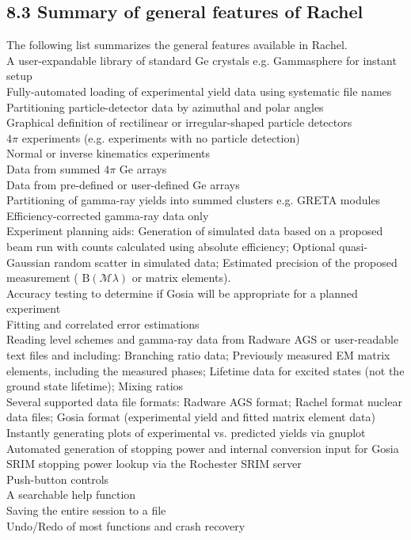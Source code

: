 \documentclass[10pt]{article}
\begin{document}
\subsection*{8.3 Summary of general features of Rachel}
The following list summarizes the general features available in Rachel.\\
A user-expandable library of standard Ge crystals e.g. Gammasphere for instant setup\\
Fully-automated loading of experimental yield data using systematic file names\\
Partitioning particle-detector data by azimuthal and polar angles\\
Graphical definition of rectilinear or irregular-shaped particle detectors\\
$4 \pi$ experiments (e.g. experiments with no particle detection)\\
Normal or inverse kinematics experiments\\
Data from summed $4 \pi$ Ge arrays\\
Data from pre-defined or user-defined Ge arrays\\
Partitioning of gamma-ray yields into summed clusters e.g. GRETA modules\\
Efficiency-corrected gamma-ray data only\\
Experiment planning aids: Generation of simulated data based on a proposed beam run with counts calculated using absolute efficiency; Optional quasi-Gaussian random scatter in simulated data; Estimated precision of the proposed measurement ( $\mathrm{B}(\mathcal{M} \lambda)$ or matrix elements).\\
Accuracy testing to determine if Gosia will be appropriate for a planned experiment\\
Fitting and correlated error estimations\\
Reading level schemes and gamma-ray data from Radware AGS or user-readable text files and including: Branching ratio data; Previously measured EM matrix elements, including the measured phases; Lifetime data for excited states (not the ground state lifetime); Mixing ratios\\
Several supported data file formats: Radware AGS format; Rachel format nuclear data files; Gosia format (experimental yield and fitted matrix element data)\\
Instantly generating plots of experimental vs. predicted yields via gnuplot\\
Automated generation of stopping power and internal conversion input for Gosia\\
SRIM stopping power lookup via the Rochester SRIM server\\
Push-button controls\\
A searchable help function\\
Saving the entire session to a file\\
Undo/Redo of most functions and crash recovery
\end{document}
